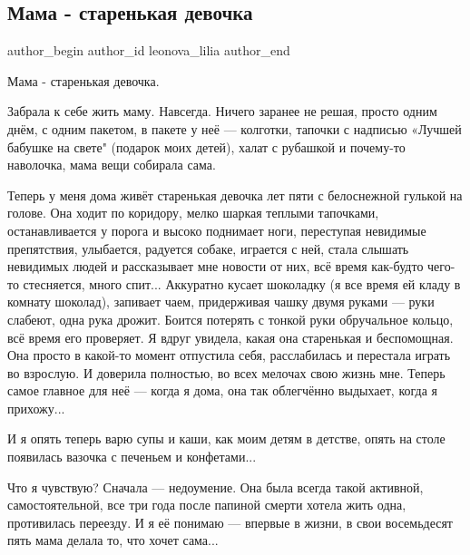  
 
 
 
 

\subsection{Мама - старенькая девочка}

\ifcmt
  author_begin
   author_id leonova_lilia
  author_end
\fi

Мама - старенькая девочка.

Забрала к себе жить маму. Навсегда. Ничего заранее не решая, просто одним днём,
с одним пакетом, в пакете у неё — колготки, тапочки с надписью «Лучшей бабушке
на свете" (подарок моих детей), халат с рубашкой и почему-то наволочка, мама
вещи собирала сама.

Теперь у меня дома живёт старенькая девочка лет пяти с белоснежной гулькой на
голове. Она ходит по коридору, мелко шаркая теплыми тапочками, останавливается
у порога и высоко поднимает ноги, переступая невидимые препятствия, улыбается,
радуется собаке, играется с ней, стала слышать невидимых людей и рассказывает
мне новости от них, всё время как-будто чего-то стесняется, много спит...
Аккуратно кусает шоколадку (я все время ей кладу в комнату шоколад), запивает
чаем, придерживая чашку двумя руками — руки слабеют, одна рука дрожит.  Боится
потерять с тонкой руки обручальное кольцо, всё время его проверяет. Я вдруг
увидела, какая она старенькая и беспомощная. Она просто в какой-то момент
отпустила себя, расслабилась и перестала играть во взрослую.  И доверила
полностью, во всех мелочах свою жизнь мне. Теперь самое главное для неё — когда
я дома, она так облегчённо выдыхает, когда я прихожу...

И я опять теперь варю супы и каши, как моим детям в детстве, опять на столе
появилась вазочка с печеньем и конфетами...

Что я чувствую? Сначала — недоумение. Она была всегда такой активной,
самостоятельной,  все три года после папиной смерти хотела жить одна,
противилась переезду.  И я её понимаю — впервые в жизни, в свои восемьдесят
пять мама делала то, что хочет сама...

